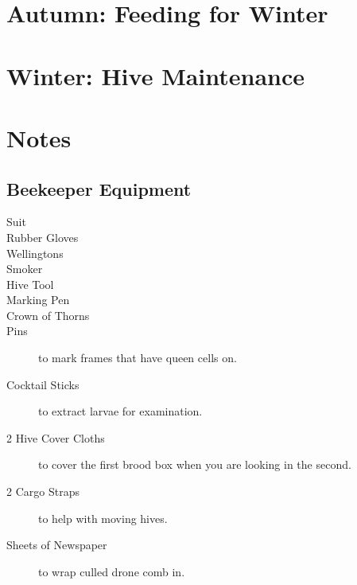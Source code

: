 \documentclass{./BeekeepingBook}
\begin{document}
\clearpage
\section{Autumn: Feeding for Winter}
\clearpage

\clearpage

\clearpage


\clearpage
\section{Winter: Hive Maintenance}
\clearpage

\clearpage

\clearpage


\clearpage
\section{Notes}

\subsection{Beekeeper Equipment}

\begin{description}
  \item[Suit]  
  \item[Rubber Gloves] 
  \item[Wellingtons] 
  \item[Smoker] 
  \item[Hive Tool] 
  \item[Marking Pen]
  \item[Crown of Thorns]
  \item[Pins] to mark frames that have queen cells on.
  \item[Cocktail Sticks] to extract larvae for examination.
  \item[2 Hive Cover Cloths] to cover the first brood box when you are looking in the second.
  \item[2 Cargo Straps] to help with moving hives. 
  \item[Sheets of Newspaper] to wrap culled drone comb in.
\end{description}
\end{document}
